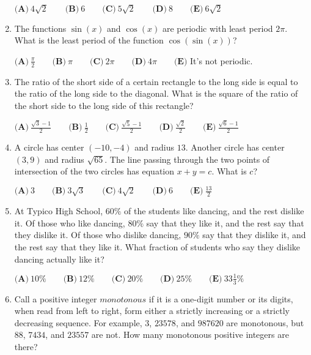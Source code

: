 \documentclass{article}
\begin{document}
\begin{enumerate}[label=\arabic*., itemsep=0.5em]
$\textbf{(A)}\ 4\sqrt{2} \qquad \textbf{(B)}\ 6\qquad \textbf{(C)}\ 5\sqrt{2}\qquad \textbf{(D)}\ 8\qquad \textbf{(E)}\ 6\sqrt{2}$\par \vspace{0.5em}\item The functions $\sin(x)$ and $\cos(x)$ are periodic with least period $2\pi$. What is the least period of the function $\cos(\sin(x))$?

$\textbf{(A)}\ \frac{\pi}{2}\qquad\textbf{(B)}\ \pi\qquad\textbf{(C)}\ 2\pi \qquad\textbf{(D)}\ 4\pi \qquad\textbf{(E)}$ It's not periodic.\par \vspace{0.5em}\item The ratio of the short side of a certain rectangle to the long side is equal to the ratio of the long side to the diagonal. What is the square of the ratio of the short side to the long side of this rectangle?

$\textbf{(A)}\ \frac{\sqrt{3}-1}{2}\qquad\textbf{(B)}\ \frac{1}{2}\qquad\textbf{(C)}\ \frac{\sqrt{5}-1}{2} \qquad\textbf{(D)}\ \frac{\sqrt{2}}{2} \qquad\textbf{(E)}\ \frac{\sqrt{6}-1}{2}$\par \vspace{0.5em}\item A circle has center $(-10,-4)$ and radius $13$. Another circle has center $(3,9)$ and radius $\sqrt{65}$. The line passing through the two points of intersection of the two circles has equation $x + y = c$. What is $c$?

$\textbf{(A)}\ 3\qquad\textbf{(B)}\ 3\sqrt{3}\qquad\textbf{(C)}\ 4\sqrt{2}\qquad\textbf{(D)}\ 6\qquad\textbf{(E)}\ \frac{13}{2}$\par \vspace{0.5em}\item At Typico High School, $60\%$ of the students like dancing, and the rest dislike it. Of those who like dancing, $80\%$ say that they like it, and the rest say that they dislike it. Of those who dislike dancing, $90\%$ say that they dislike it, and the rest say that they like it. What fraction of students who say they dislike dancing actually like it?

$\textbf{(A)}\ 10\%\qquad\textbf{(B)}\ 12\%\qquad\textbf{(C)}\ 20\%\qquad\textbf{(D)}\ 25\%\qquad\textbf{(E)}\ 33\frac{1}{3}\%$\par \vspace{0.5em}\item Call a positive integer $monotonous$ if it is a one-digit number or its digits, when read from left to right, form either a strictly increasing or a strictly decreasing sequence. For example, $3$, $23578$, and $987620$ are monotonous, but $88$, $7434$, and $23557$ are not. How many monotonous positive integers are there?


\end{enumerate}
\end{document}
